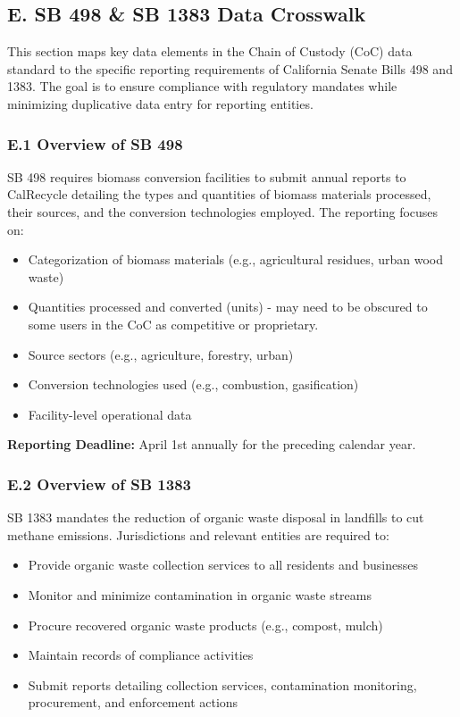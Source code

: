 \documentclass{article}
\begin{document}
\subsection*{E. SB 498 \& SB 1383 Data Crosswalk}

This section maps key data elements in the Chain of Custody (CoC) data standard to the specific reporting requirements of California Senate Bills 498 and 1383. The goal is to ensure compliance with regulatory mandates while minimizing duplicative data entry for reporting entities.

\subsubsection*{E.1 Overview of SB 498}

SB 498 requires biomass conversion facilities to submit annual reports to CalRecycle detailing the types and quantities of biomass materials processed, their sources, and the conversion technologies employed. The reporting focuses on:

\begin{itemize}[noitemsep]
    \item Categorization of biomass materials (e.g., agricultural residues, urban wood waste)
    \item Quantities processed and converted (units) - may need to be obscured to some users in the CoC as competitive or proprietary.
    \item Source sectors (e.g., agriculture, forestry, urban)
    \item Conversion technologies used (e.g., combustion, gasification)
    \item Facility-level operational data
\end{itemize}

\textbf{Reporting Deadline:} April 1st annually for the preceding calendar year.

\subsubsection*{E.2 Overview of SB 1383}

SB 1383 mandates the reduction of organic waste disposal in landfills to cut methane emissions. Jurisdictions and relevant entities are required to:

\begin{itemize}[noitemsep]
    \item Provide organic waste collection services to all residents and businesses
    \item Monitor and minimize contamination in organic waste streams
    \item Procure recovered organic waste products (e.g., compost, mulch)
    \item Maintain records of compliance activities
    \item Submit reports detailing collection services, contamination monitoring, procurement, and enforcement actions
\end{itemize}
\end{document}
